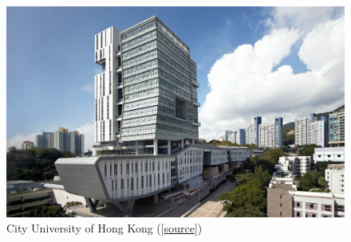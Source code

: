 \begin{figure}[H]
    \includegraphics[width=\columnwidth]{AC3}
    \caption{City University of Hong Kong ([\href{shorturl.at/qsLR0}{source}])}
    \label{fig:1}
\end{figure}